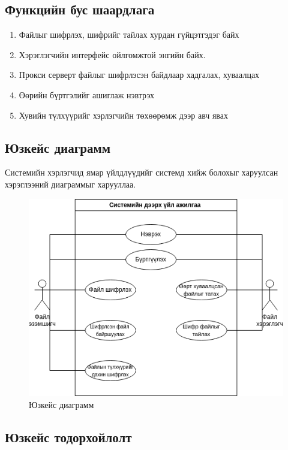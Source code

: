 \subsection*{Функцийн бус шаардлага}
\begin{enumerate}
    \item Файлыг шифрлэх, шифрийг тайлах хурдан гүйцэтгэдэг байх
    \item Хэрэглэгчийн интерфейс ойлгомжтой энгийн байх.
    \item Прокси серверт файлыг шифрлэсэн байдлаар хадгалах, хуваалцах
    \item Өөрийн бүртгэлийг ашиглаж нэвтрэх
    \item Хувийн түлхүүрийг хэрлэгчийн төхөөрөмж дээр авч явах
\end{enumerate}

\subsection*{Юзкейс диаграмм}
Системийн хэрлэгчид ямар үйлдлүүдийг системд хийж болохыг харуулсан хэрэглээний диаграммыг харууллаа.
\begin{figure}[ht]
    \centering
    \includegraphics[scale=0.6]{Figures/usecase.drawio.png}
    \caption[Usecase diagram]{Юзкейс диаграмм}
    \label{fig:usecase}
\end{figure}
\subsection*{Юзкейс тодорхойлолт}


